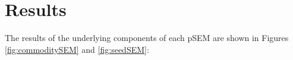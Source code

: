\documentclass[12pt, draft]{article} %
\begin{document}
\section{Results}


The results of the underlying components of each pSEM are shown in Figures \ref{fig:commoditySEM} and \ref{fig:seedSEM}:
\end{document}
